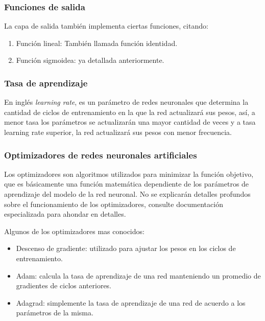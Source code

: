 \documentclass[a4paper,12pt,oneside,spanish]{book}
\begin{document}
\subsubsection{Funciones de salida}
La capa de salida también implementa ciertas funciones, citando:\par

\begin{enumerate}
	\baselineskip 10pt
	\item Función lineal: También llamada función identidad. 
	\item Función sigmoidea: ya detallada anteriormente. 
\end{enumerate}	\baselineskip 16pt

\subsubsection{Tasa de aprendizaje}
En inglés \textit{learning rate}, es un parámetro de redes neuronales que determina la cantidad de ciclos de entrenamiento en la que la red actualizará sus pesos, así, a menor tasa los parámetros se actualizarán una mayor cantidad de veces y a tasa learning rate superior, la red actualizará sus pesos con menor frecuencia.

\subsubsection{Optimizadores de redes neuronales artificiales}
Los optimizadores son algoritmos utilizados para minimizar la función objetivo, que es básicamente una función matemática dependiente de los parámetros de aprendizaje del modelo de la red neuronal. No se explicarán detalles profundos sobre el funcionamiento de los optimizadores, consulte documentación especializada para ahondar en detalles.\par

Algunos de los optimizadores mas conocidos:
\begin{itemize}
	\baselineskip 10pt
	\item Descenso de gradiente: utilizado para ajustar los pesos en los ciclos de entrenamiento.
	\item Adam: calcula la tasa de aprendizaje de una red manteniendo un promedio de gradientes de ciclos anteriores.
	\item Adagrad: simplemente la tasa de aprendizaje de una red de acuerdo a los parámetros de la misma.
\end{itemize}	\baselineskip 16pt
\end{document}
